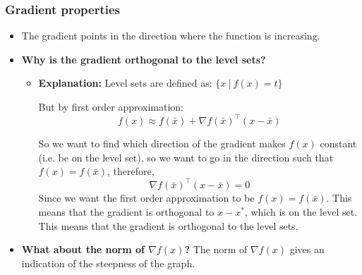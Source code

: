     \begin{example}
    \end{example}

    \subsubsection{Gradient properties}
    \begin{intuition}
        \begin{itemize}
            \item The gradient points in the direction where the function is increasing.
            \item \textbf{Why is the gradient orthogonal to the level sets?}
            \begin{itemize}
                \item \textbf{Explanation:} Level sets are defined as: $\{ x \ | \ f(x) = t \} $
        
                But by first order approximation:
                \[
                f(x) \approx f(\bar{x}) + \nabla f(\bar{x})^\top (x - \bar{x})
                \]
        
                So we want to find which direction of the gradient makes $f(x)$ constant (i.e. be on the level set), so we want to go in the direction such that $f(x) = f(\bar{x})$, therefore,
                \[
                \nabla f(\bar{x})^\top (x - \bar{x}) = 0
                \]
                Since we want the first order approximation to be $f(x) = f(\bar{x})$. This means that the gradient is orthogonal to $x-x^{*}$, which is on the level set. This means that the gradient is orthogonal to the level sets.
            \end{itemize}
            \item \textbf{What about the norm of $\nabla f(x)$?} The norm of $\nabla f(x)$ gives an indication of the steepness of the graph.


\end{itemize}
\end{intuition}
